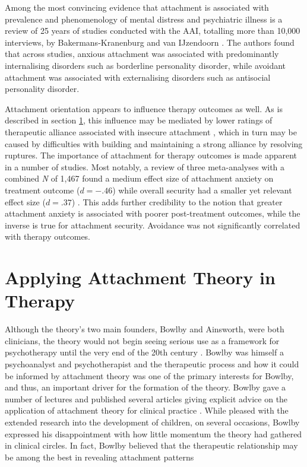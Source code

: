 \documentclass[12pt]{report}
\begin{document}
Among the most convincing evidence that attachment is associated with prevalence and phenomenology of mental distress and psychiatric illness is a review of 25 years of studies conducted with the AAI, totalling more than 10,000 interviews, by Bakermans-Kranenburg and van IJzendoorn \citeyear{Bakermanskranenburg2009}.
The authors found that across studies, anxious attachment was associated with predominantly internalising disorders such as borderline personality disorder, while avoidant attachment was associated with externalising disorders such as antisocial personality disorder.

Attachment orientation appears to influence therapy outcomes as well.
As is described in section \ref{sec:Applying attachment in therapy}, this influence may be mediated by lower ratings of therapeutic alliance associated with insecure attachment \cite{Baier2020}, which in turn may be caused by difficulties with building and maintaining a strong alliance by resolving ruptures.
The importance of attachment for therapy outcomes is made apparent in a number of studies. Most notably, a review of three meta-analyses with a combined \textit{N} of 1,467 found a medium effect size of attachment anxiety on treatment outcome ($d=-.46$) while overall security had a smaller yet relevant effect size ($d=.37$) \cite{Levy2011}. This adds further credibility to the notion that greater attachment anxiety is associated with poorer post-treatment outcomes, while the inverse is true for attachment security. Avoidance was not significantly correlated with therapy outcomes.

\section{Applying Attachment Theory in Therapy}
\label{sec:Applying attachment in therapy}
Although the theory's two main founders, Bowlby and Ainsworth, were both clinicians, the theory would not begin seeing serious use as a framework for psychotherapy until the very end of the 20th century \cite{Slade2019}.
Bowlby was himself a psychoanalyst and psychotherapist and the therapeutic process and how it could be informed by attachment theory was one of the primary interests for Bowlby, and thus, an important driver for the formation of the theory.
Bowlby gave a number of lectures and published several articles giving explicit advice on the application of attachment theory for clinical practice \cite{Bowlby2005b}.
While pleased with the extended research into the development of children, on several occasions, Bowlby expressed his disappointment with how little momentum the theory had gathered in clinical circles.
In fact, Bowlby believed that the therapeutic relationship may be among the best in revealing attachment patterns \cite{Bowlby1988}
\end{document}
